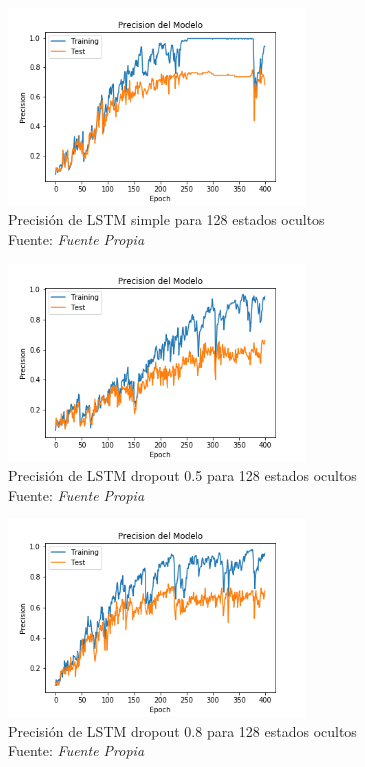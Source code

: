 \begin{figure}[H]
	\centering
	\includegraphics[width=0.7\textwidth]{Figures/lstm_400_prec_13mfcc}
	\caption{Precisión de LSTM simple para 128 estados ocultos\\ Fuente: {\textit{Fuente Propia}}}
	\label{LSTMsimpel}
\end{figure} 

\begin{figure}[H]
	\centering
	\includegraphics[width=0.7\textwidth]{Figures/lstm_400drop05_prec_13mfcc}
	\caption{Precisión de LSTM dropout 0.5 para 128 estados ocultos\\ Fuente: {\textit{Fuente Propia}}}
	\label{LSTMdropout5}
\end{figure} 


\begin{figure}[H]
	\centering
	\includegraphics[width=0.7\textwidth]{Figures/lstm_400drop08_prec_13mfcc}
	\caption{Precisión de LSTM dropout 0.8 para 128 estados ocultos\\ Fuente: {\textit{Fuente Propia}}}
	\label{LSTMdropout8}
\end{figure} 
\newpage
